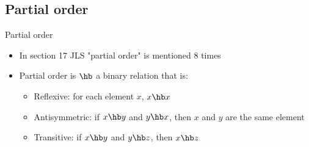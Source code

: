 \ifrender
\subsection{Partial order}
\begin{frame}{Partial order}
\begin{itemize}[<+->]
\item In section 17 JLS "partial order" is mentioned 8 times
\item Partial order is $\hb$ a binary relation that is:
\begin{itemize}
\item Reflexive: for each element $x$, $x \hb x$
\item Antisymmetric: if $x \hb y$ and $y \hb x$, then $x$ and $y$ are the same element
\item Transitive: if $x \hb y$ and $y \hb z$, then $x \hb z$
\end{itemize}
\end{itemize}
\end{frame}
\fi
